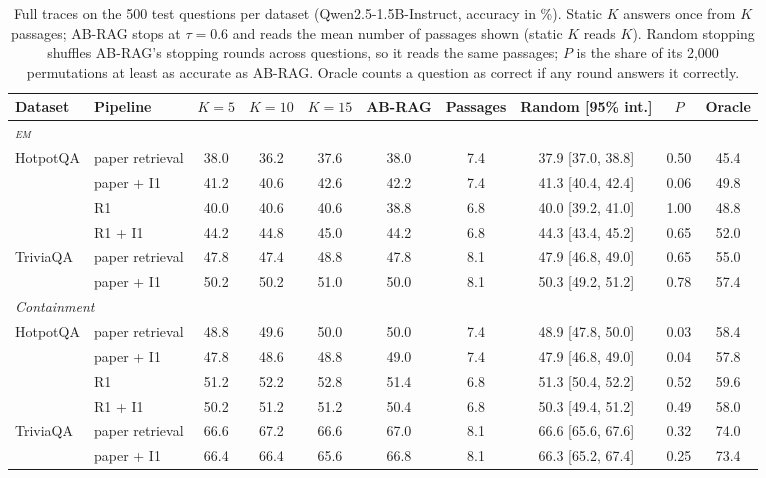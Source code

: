 \documentclass[11pt]{article}
\newcommand{\EM}{\textsc{em}}
\begin{document}
\begin{table}[t]
\centering
\footnotesize
\setlength{\tabcolsep}{4.5pt}
\begin{tabular}{llcccccccc}
\toprule
Dataset & Pipeline & $K{=}5$ & $K{=}10$ & $K{=}15$ & AB-RAG & Passages & Random [95\% int.] & $P$ & Oracle \\
\midrule
\multicolumn{10}{l}{\emph{\EM{}}} \\
\multirow{4}{*}{HotpotQA} & paper retrieval & 38.0 & 36.2 & 37.6 & 38.0 & 7.4 & 37.9 [37.0, 38.8] & 0.50 & 45.4 \\
& paper + I1 & 41.2 & 40.6 & 42.6 & 42.2 & 7.4 & 41.3 [40.4, 42.4] & 0.06 & 49.8 \\
& R1 & 40.0 & 40.6 & 40.6 & 38.8 & 6.8 & 40.0 [39.2, 41.0] & 1.00 & 48.8 \\
& R1 + I1 & 44.2 & 44.8 & 45.0 & 44.2 & 6.8 & 44.3 [43.4, 45.2] & 0.65 & 52.0 \\
\multirow{2}{*}{TriviaQA} & paper retrieval & 47.8 & 47.4 & 48.8 & 47.8 & 8.1 & 47.9 [46.8, 49.0] & 0.65 & 55.0 \\
& paper + I1 & 50.2 & 50.2 & 51.0 & 50.0 & 8.1 & 50.3 [49.2, 51.2] & 0.78 & 57.4 \\
\midrule
\multicolumn{10}{l}{\emph{Containment}} \\
\multirow{4}{*}{HotpotQA} & paper retrieval & 48.8 & 49.6 & 50.0 & 50.0 & 7.4 & 48.9 [47.8, 50.0] & 0.03 & 58.4 \\
& paper + I1 & 47.8 & 48.6 & 48.8 & 49.0 & 7.4 & 47.9 [46.8, 49.0] & 0.04 & 57.8 \\
& R1 & 51.2 & 52.2 & 52.8 & 51.4 & 6.8 & 51.3 [50.4, 52.2] & 0.52 & 59.6 \\
& R1 + I1 & 50.2 & 51.2 & 51.2 & 50.4 & 6.8 & 50.3 [49.4, 51.2] & 0.49 & 58.0 \\
\multirow{2}{*}{TriviaQA} & paper retrieval & 66.6 & 67.2 & 66.6 & 67.0 & 8.1 & 66.6 [65.6, 67.6] & 0.32 & 74.0 \\
& paper + I1 & 66.4 & 66.4 & 65.6 & 66.8 & 8.1 & 66.3 [65.2, 67.4] & 0.25 & 73.4 \\
\bottomrule
\end{tabular}
\caption{Full traces on the 500 test questions per dataset (Qwen2.5-1.5B-Instruct, accuracy in \%). Static $K$ answers once from $K$ passages; AB-RAG stops at $\tau = 0.6$ and reads the mean number of passages shown (static $K$ reads $K$). Random stopping shuffles AB-RAG's stopping rounds across questions, so it reads the same passages; $P$ is the share of its 2{,}000 permutations at least as accurate as AB-RAG. Oracle counts a question as correct if any round answers it correctly.}
\label{tab:fulltrace}
\end{table}
\end{document}
